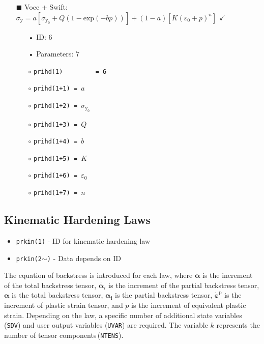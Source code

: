 \documentclass[11pt,a4paper,twoside,final,onecolumn,titlepage]{article}
\newcommand{\verified}{\hspace{0.5pt} {\LARGE $\checkmark$}}
\begin{document}
\newpage
\begin{itemize}
	\item[\tiny$\blacksquare$] Voce + Swift: $\displaystyle \sigma_{\textrm{y}} = a\left[\sigma_{\textrm{y}_0} + Q\left(1-\textrm{exp}(-bp)\right)\right]+ (1-a)\left[K(\varepsilon_0+p)^n\right]$ \verified{}
	\begin{itemize}
		\item[•] ID: $6$
		\item[•] Parameters: $7$\\
		\item[$\circ$] \texttt{prihd(1)\,\,\,\,\,\,\,\,\,= 6}
		\item[$\circ$] \texttt{prihd(1+1) = $a$}
		\item[$\circ$] \texttt{prihd(1+2) = $\sigma_{\textrm{y}_0} $}
		\item[$\circ$] \texttt{prihd(1+3) = $Q$} 
		\item[$\circ$] \texttt{prihd(1+4) = $b$} 
		\item[$\circ$] \texttt{prihd(1+5) = $K$} 
		\item[$\circ$] \texttt{prihd(1+6) = $\varepsilon_0$} 
		\item[$\circ$] \texttt{prihd(1+7) = $n$}
	\end{itemize}
\end{itemize}

\vspace{0.2cm}
\subsection{Kinematic Hardening Laws}
\vspace{0.2cm}

\begin{itemize}
	\item \texttt{prkin(1)} - ID for kinematic hardening law
	\item \texttt{prkin(2$\mathtt{\sim}$)} - Data depends on ID
\end{itemize}

\noindent The equation of backstress is introduced for each law, where $\dot{\bm{\alpha}}$ is the increment of the total backstress tensor, $\dot{\bm{\alpha}_i}$ is the increment of the partial backstress tensor, $\bm{\alpha}$ is the total backstress tensor, $\bm{\alpha_i}$ is the partial backstress tensor, $\dot{\bm{\varepsilon}}^\textrm{p}$ is the increment of plastic strain tensor, and $\dot{p}$ is the increment of equivalent plastic strain. Depending on the law, a specific number of additional state variables (\texttt{SDV}) and user output variables (\texttt{UVAR}) are required. The variable $k$ represents the number of tensor components\,(\texttt{NTENS}). 
\vspace{0.1cm}
\end{document}
